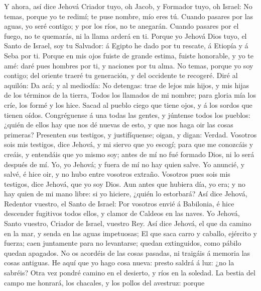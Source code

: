  Y ahora, así dice Jehová Criador tuyo, oh Jacob, y
Formador tuyo, oh Israel: No temas, porque yo te redimí; te puse nombre,
mío eres tú.  Cuando pasares por las aguas, yo seré
contigo; y por los ríos, no te anegarán. Cuando pasares por el fuego, no
te quemarás, ni la llama arderá en ti.  Porque yo Jehová
Dios tuyo, el Santo de Israel, soy tu Salvador: á Egipto he dado por tu
rescate, á Etiopía y á Seba por ti.  Porque en mis ojos
fuiste de grande estima, fuiste honorable, y yo te amé: daré pues
hombres por ti, y naciones por tu alma.  No temas, porque
yo soy contigo; del oriente traeré tu generación, y del occidente te
recogeré.  Diré al aquilón: Da acá; y al mediodía: No
detengas: trae de lejos mis hijos, y mis hijas de los términos de la
tierra,  Todos los llamados de mi nombre; para gloria mía
los críe, los formé y los hice.  Sacad al pueblo ciego que
tiene ojos, y á los sordos que tienen oídos.  Congréguense
á una todas las gentes, y júntense todos los pueblos: ¿quién de ellos
hay que nos dé nuevas de esto, y que nos haga oir las cosas primeras?
Presenten sus testigos, y justifíquense; oigan, y digan: Verdad.
 Vosotros sois mis testigos, dice Jehová, y mi siervo que
yo escogí; para que me conozcáis y creáis, y entendáis que yo mismo soy;
antes de mí no fué formado Dios, ni lo será después de mí.
 Yo, yo Jehová; y fuera de mí no hay quien salve.
 Yo anuncié, y salvé, é hice oir, y no hubo entre
vosotros extraño. Vosotros pues sois mis testigos, dice Jehová, que yo
soy Dios.  Aun antes que hubiera día, yo era; y no hay
quien de mi mano libre: si yo hiciere, ¿quién lo estorbará?
 Así dice Jehová, Redentor vuestro, el Santo de Israel:
Por vosotros envié á Babilonia, é hice descender fugitivos todos ellos,
y clamor de Caldeos en las naves.  Yo Jehová, Santo
vuestro, Criador de Israel, vuestro Rey.  Así dice
Jehová, el que da camino en la mar, y senda en las aguas impetuosas;
 El que saca carro y caballo, ejército y fuerza; caen
juntamente para no levantarse; quedan extinguidos, como pábilo quedan
apagados.  No os acordéis de las cosas pasadas, ni
traigáis á memoria las cosas antiguas.  He aquí que yo
hago cosa nueva: presto saldrá á luz: ¿no la sabréis? Otra vez pondré
camino en el desierto, y ríos en la soledad.  La bestia
del campo me honrará, los chacales, y los pollos del avestruz: porque

